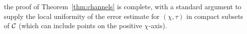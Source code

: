 the proof of Theorem~\ref{thm:channels} is complete, with a standard argument to supply the local uniformity of the error estimate for $(\chi,\tau)$ in compact subsets of $\mathcal{C}$ (which can include points on the positive $\chi$-axis).

